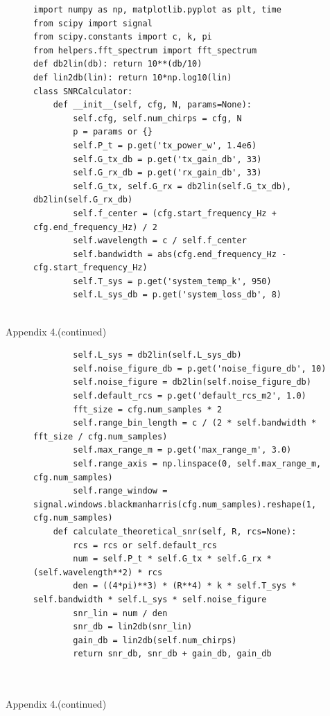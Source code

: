 \newpage
{}

\begin{figure}[H]
\centering
\begin{verbatim}
import numpy as np, matplotlib.pyplot as plt, time
from scipy import signal
from scipy.constants import c, k, pi
from helpers.fft_spectrum import fft_spectrum
def db2lin(db): return 10**(db/10)
def lin2db(lin): return 10*np.log10(lin)
class SNRCalculator:
    def __init__(self, cfg, N, params=None):
        self.cfg, self.num_chirps = cfg, N
        p = params or {}
        self.P_t = p.get('tx_power_w', 1.4e6)
        self.G_tx_db = p.get('tx_gain_db', 33)
        self.G_rx_db = p.get('rx_gain_db', 33)
        self.G_tx, self.G_rx = db2lin(self.G_tx_db), db2lin(self.G_rx_db)
        self.f_center = (cfg.start_frequency_Hz + cfg.end_frequency_Hz) / 2
        self.wavelength = c / self.f_center
        self.bandwidth = abs(cfg.end_frequency_Hz - cfg.start_frequency_Hz)
        self.T_sys = p.get('system_temp_k', 950)
        self.L_sys_db = p.get('system_loss_db', 8)
 
\end{verbatim}
\end{figure}
\newpage
\hfill \large Appendix 4.(continued)

\begin{figure}[H]
\centering
\begin{verbatim}
        self.L_sys = db2lin(self.L_sys_db)
        self.noise_figure_db = p.get('noise_figure_db', 10)
        self.noise_figure = db2lin(self.noise_figure_db)
        self.default_rcs = p.get('default_rcs_m2', 1.0)
        fft_size = cfg.num_samples * 2
        self.range_bin_length = c / (2 * self.bandwidth * fft_size / cfg.num_samples)
        self.max_range_m = p.get('max_range_m', 3.0)
        self.range_axis = np.linspace(0, self.max_range_m, cfg.num_samples)
        self.range_window = signal.windows.blackmanharris(cfg.num_samples).reshape(1, cfg.num_samples)
    def calculate_theoretical_snr(self, R, rcs=None):
        rcs = rcs or self.default_rcs
        num = self.P_t * self.G_tx * self.G_rx * (self.wavelength**2) * rcs
        den = ((4*pi)**3) * (R**4) * k * self.T_sys * self.bandwidth * self.L_sys * self.noise_figure
        snr_lin = num / den
        snr_db = lin2db(snr_lin)
        gain_db = lin2db(self.num_chirps)
        return snr_db, snr_db + gain_db, gain_db

    
\end{verbatim}
\end{figure}
\newpage
\hfill \large Appendix 4.(continued)

